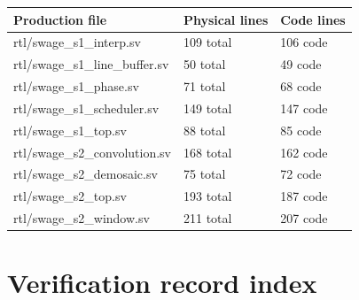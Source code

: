 \documentclass[11pt,a4paper]{article}
\begin{document}
{\small\renewcommand{\arraystretch}{1.18}\begin{longtable}{@{}L{0.55\textwidth}|L{0.18\textwidth}|L{0.18\textwidth}@{}}\toprule

\textbf{Production file} & \textbf{Physical lines} & \textbf{Code lines}\\\midrule\endhead

rtl/\allowbreak{}swage\_\allowbreak{}s1\_\allowbreak{}interp.sv & 109 total & 106 code\\[2pt]\hline

rtl/\allowbreak{}swage\_\allowbreak{}s1\_\allowbreak{}line\_\allowbreak{}buffer.sv & 50 total & 49 code\\[2pt]\hline

rtl/\allowbreak{}swage\_\allowbreak{}s1\_\allowbreak{}phase.sv & 71 total & 68 code\\[2pt]\hline

rtl/\allowbreak{}swage\_\allowbreak{}s1\_\allowbreak{}scheduler.sv & 149 total & 147 code\\[2pt]\hline

rtl/\allowbreak{}swage\_\allowbreak{}s1\_\allowbreak{}top.sv & 88 total & 85 code\\[2pt]\hline

rtl/\allowbreak{}swage\_\allowbreak{}s2\_\allowbreak{}convolution.sv & 168 total & 162 code\\[2pt]\hline

rtl/\allowbreak{}swage\_\allowbreak{}s2\_\allowbreak{}demosaic.sv & 75 total & 72 code\\[2pt]\hline

rtl/\allowbreak{}swage\_\allowbreak{}s2\_\allowbreak{}top.sv & 193 total & 187 code\\[2pt]\hline

rtl/\allowbreak{}swage\_\allowbreak{}s2\_\allowbreak{}window.sv & 211 total & 207 code\\[2pt]\hline

\bottomrule\end{longtable}}

\section{Verification record index}
\end{document}
